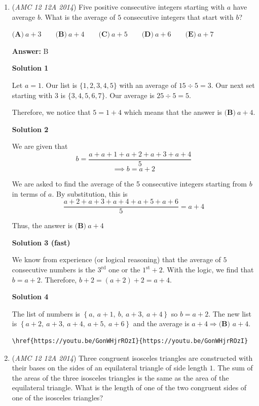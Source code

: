 \begin{enumerate}
 


	\item (\textit{AMC 12 12A 2014}) Five positive consecutive integers starting with $a$ have average $b$. What is the average of $5$ consecutive integers that start with $b$?


 $\textbf{(A)}\ a+3\qquad\textbf{(B)}\ a+4\qquad\textbf{(C)}\ a+5\qquad\textbf{(D)}\ a+6\qquad\textbf{(E)}\ a+7$

 \textbf{Answer: }B



\textbf{Solution 1}

Let $a=1$. Our list is $\{1,2,3,4,5\}$ with an average of $15\div 5=3$. Our next set starting with $3$ is $\{3,4,5,6,7\}$. Our average is $25\div 5=5$.

 Therefore, we notice that $5=1+4$ which means that the answer is $\boxed{\textbf{(B)}\ a+4}$.

 



\textbf{Solution 2}

We are given that 
 \[b=\frac{a+a+1+a+2+a+3+a+4}{5}\]
 \[\implies b =a+2\]

 We are asked to find the average of the 5 consecutive integers starting from $b$ in terms of $a$. By substitution, this is 
 \[\frac{a+2+a+3+a+4+a+5+a+6}5=a+4\]

 Thus, the answer is $\boxed{\textbf{(B)}\ a+4}$




\textbf{Solution 3 (fast)}

We know from experience (or logical reasoning) that the average of $5$ consecutive numbers is the $3^\text{rd}$ one or the $1^\text{st} + 2$. With the logic, we find that $b=a+2$. Therefore, $b+2=(a+2)+2=\boxed{a+4}$.

 



\textbf{Solution 4}

The list of numbers is $\left\{a,\ a+1,\ b,\ a+3,\ a+4\right\}$ so $b=a+2$. The new list is $\left\{a+2,\ a+3,\ a+4,\ a+5,\ a+6\right\}$ and the average is $a+4 \Longrightarrow \boxed{\textbf{(B) } a+4}$.

 \begin{verbatim}
\href{https://youtu.be/GonWHjrROzI}{https://youtu.be/GonWHjrROzI}
\end{verbatim}





	\item (\textit{AMC 12 12A 2014}) Three congruent isosceles triangles are constructed with their bases on the sides of an equilateral triangle of side length $1$.  The sum of the areas of the three isosceles triangles is the same as the area of the equilateral triangle.  What is the length of one of the two congruent sides of one of the isosceles triangles?



\end{enumerate}
